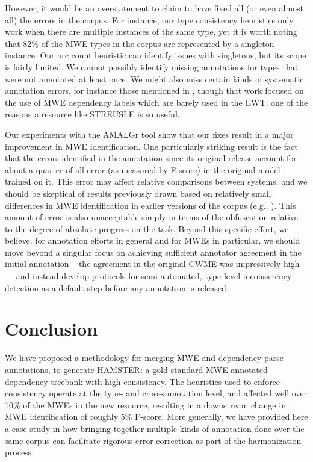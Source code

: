 \documentclass[output=paper,modfonts,nonflat]{langsci/langscibook}
\begin{document}
However, it would be an overstatement to claim to have fixed all (or even almost all) the errors in the corpus. For instance, our type consistency heuristics only work when there are multiple instances of the same type, yet it is worth noting that 82\% of the MWE types in the corpus are represented by a singleton instance. Our arc count heuristic can identify issues with singletons, but its scope is fairly limited. We cannot possibly identify missing annotations for types that were not annotated at least once. We might also miss certain kinds of systematic annotation errors, for instance those mentioned in \citet{de2015studying}, though that work focused on the use of MWE dependency labels which are barely used in the EWT, one of the reasons a resource like STREUSLE is so useful.

Our experiments with the AMALGr tool show that our fixes result in a major improvement in MWE identification. One particularly striking result is the fact that the errors identified in the annotation since its original release account for about a quarter of all error (as measured by F-score) in the original model trained on it. This error may affect relative comparisons between systems, and we should be skeptical of results previously drawn based on relatively small differences in MWE identification in earlier versions of the corpus (e.g., \citealt{Qu+:2015a}). This amount of error is also unacceptable simply in terms of the obfuscation relative to the degree of absolute progress on the task. Beyond this specific effort, we believe, for annotation efforts in general and for MWEs in particular, we should move beyond a singular focus on achieving sufficient annotator agreement in the initial annotation -- the agreement in the original CWME was impressively high --- and instead develop protocols for semi-automated, type-level inconsistency detection as a default step before any annotation is released. 

\section{Conclusion}

We have proposed a methodology for merging MWE and dependency parse annotations, to generate HAMSTER: a gold-standard MWE-annotated dependency treebank with high consistency. The heuristics used to enforce consistency operate at the type- and cross-annotation level, and affected well over 10\% of the MWEs in the new resource, resulting in a downstream change in MWE identification of roughly 5\% F-score. More generally, we have provided here a case study in how bringing together multiple kinds of annotation done over the same corpus can facilitate rigorous error correction as part of the harmonization process.
\end{document}
